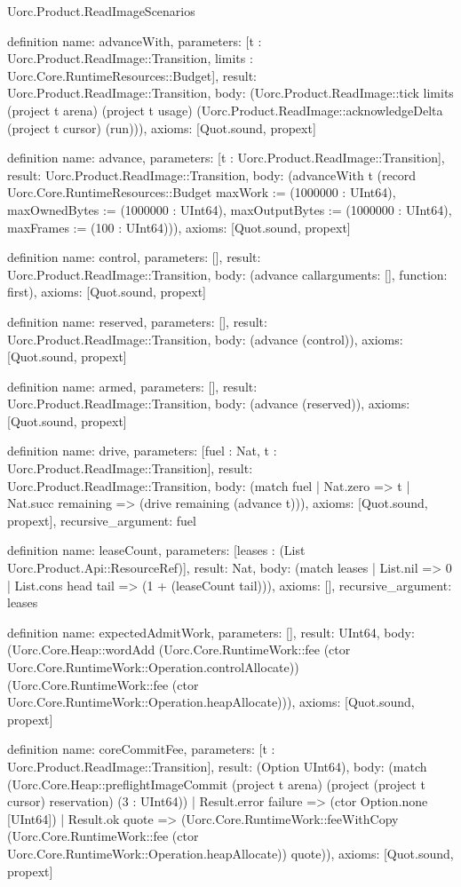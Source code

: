 \begin{lexlean}{Uorc.Product.ReadImageScenarios}
\begin{semanticmodule}
definition{
  name: advanceWith,
  parameters: [t : Uorc.Product.ReadImage::Transition, limits : Uorc.Core.RuntimeResources::Budget],
  result: Uorc.Product.ReadImage::Transition,
  body: (Uorc.Product.ReadImage::tick limits (project t arena) (project t usage) (Uorc.Product.ReadImage::acknowledgeDelta (project t cursor) (run))),
  axioms: [Quot.sound, propext]
}

definition{
  name: advance,
  parameters: [t : Uorc.Product.ReadImage::Transition],
  result: Uorc.Product.ReadImage::Transition,
  body: (advanceWith t (record Uorc.Core.RuntimeResources::Budget {maxWork := (1000000 : UInt64), maxOwnedBytes := (1000000 : UInt64), maxOutputBytes := (1000000 : UInt64), maxFrames := (100 : UInt64)})),
  axioms: [Quot.sound, propext]
}

definition{
  name: control,
  parameters: [],
  result: Uorc.Product.ReadImage::Transition,
  body: (advance call{arguments: [], function: first}),
  axioms: [Quot.sound, propext]
}

definition{
  name: reserved,
  parameters: [],
  result: Uorc.Product.ReadImage::Transition,
  body: (advance (control)),
  axioms: [Quot.sound, propext]
}

definition{
  name: armed,
  parameters: [],
  result: Uorc.Product.ReadImage::Transition,
  body: (advance (reserved)),
  axioms: [Quot.sound, propext]
}

definition{
  name: drive,
  parameters: [fuel : Nat, t : Uorc.Product.ReadImage::Transition],
  result: Uorc.Product.ReadImage::Transition,
  body: (match fuel | Nat.zero => t | Nat.succ remaining => (drive remaining (advance t))),
  axioms: [Quot.sound, propext],
  recursive_argument: fuel
}

definition{
  name: leaseCount,
  parameters: [leases : (List Uorc.Product.Api::ResourceRef)],
  result: Nat,
  body: (match leases | List.nil => 0 | List.cons head tail => (1 + (leaseCount tail))),
  axioms: [],
  recursive_argument: leases
}

definition{
  name: expectedAdmitWork,
  parameters: [],
  result: UInt64,
  body: (Uorc.Core.Heap::wordAdd (Uorc.Core.RuntimeWork::fee (ctor Uorc.Core.RuntimeWork::Operation.controlAllocate)) (Uorc.Core.RuntimeWork::fee (ctor Uorc.Core.RuntimeWork::Operation.heapAllocate))),
  axioms: [Quot.sound, propext]
}

definition{
  name: coreCommitFee,
  parameters: [t : Uorc.Product.ReadImage::Transition],
  result: (Option UInt64),
  body: (match (Uorc.Core.Heap::preflightImageCommit (project t arena) (project (project t cursor) reservation) (3 : UInt64))
    | Result.error failure => (ctor Option.none [UInt64])
    | Result.ok quote => (Uorc.Core.RuntimeWork::feeWithCopy (Uorc.Core.RuntimeWork::fee (ctor Uorc.Core.RuntimeWork::Operation.heapAllocate)) quote)),
  axioms: [Quot.sound, propext]
}


\end{semanticmodule}
\end{lexlean}
